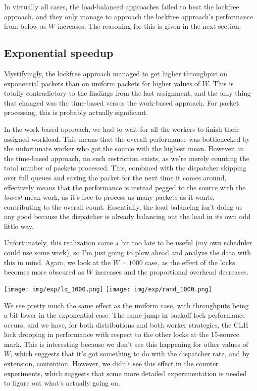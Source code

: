 \documentclass{article}
\begin{document}
In virtually all cases, the load-balanced approaches failed to beat the lockfree approach, and they only manage to approach the lockfree approach's performance from below as $W$ increases. The reasoning for this is given in the next section.

\subsection*{Exponential speedup}
Mystifyingly, the lockfree approach managed to get higher throughput on exponential packets than on uniform packets for higher values of $W$. This is totally contradictory to the findings from the last assignment, and the only thing that changed was the time-based versus the work-based approach. For packet processing, this is probably actually significant. 

In the work-based approach, we had to wait for all the workers to finish their assigned workload. This means that the overall performance was bottlenecked by the unfortunate worker who got the source with the highest mean. However, in the time-based approach, no such restriction exists, as we're merely counting the total number of packets processed. This, combined with the dispatcher skipping over full queues and saving the packet for the next time it comes around, effectively means that the performance is instead pegged to the source with the \textit{lowest} mean work, as it's free to process as many packets as it wants, contributing to the overall count. Essentially, the load balancing isn't doing us any good because the dispatcher is already balancing out the load in its own odd little way.

Unfortunately, this realization came a bit too late to be useful (my own scheduler could use some work), so I'm just going to plow ahead and analyze the data with this in mind. Again, we look at the $W=1000$ case, as the effect of the locks becomes more obscured as $W$ increases and the proportional overhead decreases.

\texttt{[image: img/exp/lq\_1000.png]}
\texttt{[image: img/exp/rand\_1000.png]}

We see pretty much the same effect as the uniform case, with throughputs being a bit lower in the exponential case. The same jump in backoff lock performance occurs, and we have, for both distributions and both worker strategies, the CLH lock drooping in performance with respect to the other locks at the 15-source mark. This is interesting because we don't see this happening for other values of $W$, which suggests that it's got something to do with the dispatcher rate, and by extension, contention. However, we didn't see this effect in the counter experiments, which suggests that some more detailed experimentation is needed to figure out what's actually going on.
\end{document}
